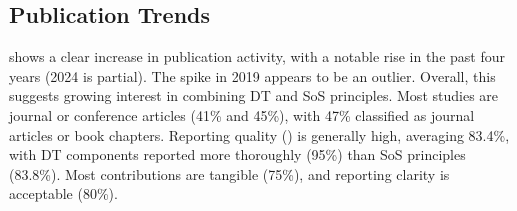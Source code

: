 \subsection{Publication Trends}\label{sec:literature-review-publication-trends}


 shows a clear increase in publication activity, with a notable rise in the past four years (2024 is partial). The spike in 2019 appears to be an outlier. Overall, this suggests growing interest in combining DT and SoS principles. Most studies are journal or conference articles (41\% and 45\%), with 47\% classified as journal articles or book chapters. Reporting quality () is generally high, averaging 83.4\%, with DT components reported more thoroughly (95\%) than SoS principles (83.8\%). Most contributions are tangible (75\%), and reporting clarity is acceptable (80\%).